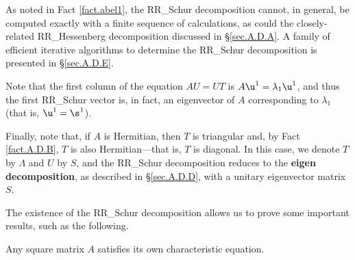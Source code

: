 As noted in Fact \ref{fact.abel1}, the RR_Schur decomposition cannot, in general, be
computed exactly with a finite sequence of calculations, as could the
closely-related RR_Hessenberg decomposition discussed in \S \ref{sec.A.D.A}.
A family of efficient iterative algorithms to determine
the RR_Schur decomposition is presented in \S \ref{sec.A.D.E}.

Note that the first column of the equation $AU=UT$ is $A\u^1=\lambda_1\u^1$, and thus the
first RR_Schur vector is, in fact, an eigenvector of $A$ corresponding to $\lambda_1$ (that is, $\u^1=\s^1$).

Finally, note that, if $A$ is Hermitian, then $T$ is triangular and,
by Fact \ref{fact.A.D.B}, $T$ is also Hermitian---that is, $T$ is diagonal.  In
this case, we denote $T$ by $\Lambda$ and $U$ by $S$, and the RR_Schur
decomposition reduces to the {\bf eigen decomposition}, as described
in \S \ref{sec.A.D.D}, with a unitary eigenvector matrix $S$.


\noindent The existence of the RR_Schur decomposition allows us to prove some
important results, such as the following.

\begin{fact} \label{fact.A.D.C.Bc} Any square
matrix $A$ satisfies its own characteristic equation.
\end{fact}

